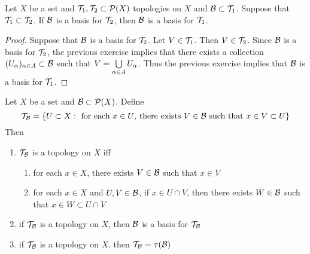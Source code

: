 \documentclass{book}
\begin{document}
	\begin{ex} 
	Let $X$ be a set and $\mathcal{T}_1, \mathcal{T}_2 \subset \mathcal{P}(X)$ topologies on $X$ and $\mathcal{B} \subset \mathcal{T}_1$. Suppose that $\mathcal{T}_1 \subset \mathcal{T}_2$. If $\mathcal{B}$ is a basis for $\mathcal{T}_2$, then $\mathcal{B}$ is a basis for $\mathcal{T}_1$.  
	\end{ex}
	
	\begin{proof}
	Suppose that $\mathcal{B}$ is a basis for $\mathcal{T}_2$. Let $V \in \mathcal{T}_1$. Then $V \in \mathcal{T}_2$. Since $\mathcal{B}$ is a basis for $\mathcal{T}_2$, the previous exercise implies that there exists a collection $(U_{\alpha})_{\alpha \in A} \subset \mathcal{B}$ such that $V = \bigcup\limits_{\alpha \in A} U_{\alpha}$. Thus the previous exercise implies that $\mathcal{B}$ is a basis for $\mathcal{T}_1$. 
	\end{proof}
	
	\begin{ex} 
	Let $X$ be a set and $\mathcal{B} \subset \mathcal{P}(X)$. Define 
	$$\mathcal{T}_{\mathcal{B}} = \{ U \subset X: \text{ for each $x \in U$, there exists $V \in \mathcal{B}$ such that $x \in V \subset U$} \}$$ Then 
	\begin{enumerate}
		\item $\mathcal{T}_{\mathcal{B}}$ is a topology on $X$ iff 
		\begin{enumerate}
			\item for each $x \in X$, there exists $V \in \mathcal{B}$ such that $x \in V$
			\item for each $x \in X$ and $U, V \in \mathcal{B}$, if $x \in U \cap V$, then there exists $W \in \mathcal{B}$ such that $x \in W \subset U \cap V$
		\end{enumerate}
		\item if $\mathcal{T}_{\mathcal{B}}$ is a topology on $X$, then $\mathcal{B}$ is a basis for $\mathcal{T}_{\mathcal{B}}$
		\item if $\mathcal{T}_{\mathcal{B}}$ is a topology on $X$, then $\mathcal{T}_{\mathcal{B}} = \tau(\mathcal{B})$
	\end{enumerate}
	\end{ex}
	
\end{document}
